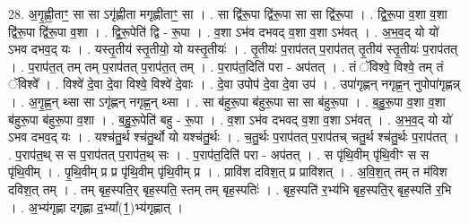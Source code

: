 \documentclass[17pt]{extarticle}
\begin{document}
28. अ॒गृ॒ह्णी॒ताꣳ॒॒ सा सा ऽगृ॑ह्णीता मगृह्णीताꣳ॒॒ सा । . सा द्वि॑रू॒पा द्वि॑रू॒पा सा सा द्वि॑रू॒पा । . द्वि॒रू॒पा व॒शा व॒शा द्वि॑रू॒पा द्वि॑रू॒पा व॒शा । . द्वि॒रू॒पेति॑ द्वि - रू॒पा । . व॒शा ऽभ॑व दभवद् व॒शा व॒शा ऽभ॑वत् । . अ॒भ॒व॒द् यो यो॑ ऽभव दभव॒द् यः । . यस्तृ॒तीय॑ स्तृ॒तीयो॒ यो यस्तृ॒तीयः॑ । . तृ॒तीयः॑ प॒राप॑तत् प॒राप॑तत् तृ॒तीय॑ स्तृ॒तीयः॑ प॒राप॑तत् । . प॒राप॑त॒त् तम् तम् प॒राप॑तत् प॒राप॑त॒त् तम् । . प॒राप॑त॒दिति॑ परा - अप॑तत् । . तं ॅविश्वे॒ विश्वे॒ तम् तं ॅविश्वे᳚ । . विश्वे॑ दे॒वा दे॒वा विश्वे॒ विश्वे॑ दे॒वाः । . दे॒वा उपोप॑ दे॒वा दे॒वा उप॑ । . उपा॑गृह्णन् नगृह्ण॒न् नुपोपा॑गृह्णन्न् । . अ॒गृ॒ह्ण॒न् थ्सा सा ऽगृ॑ह्णन् नगृह्ण॒न् थ्सा । . सा ब॑हुरू॒पा ब॑हुरू॒पा सा सा ब॑हुरू॒पा । . ब॒हु॒रू॒पा व॒शा व॒शा ब॑हुरू॒पा ब॑हुरू॒पा व॒शा । . ब॒हु॒रू॒पेति॑ बहु - रू॒पा । . व॒शा ऽभ॑व दभवद् व॒शा व॒शा ऽभ॑वत् । . अ॒भ॒व॒द् यो यो॑ ऽभव दभव॒द् यः । . यश्च॑तु॒र्थ श्च॑तु॒र्थो यो यश्च॑तु॒र्थः । . च॒तु॒र्थः प॒राप॑तत् प॒राप॑तच् चतु॒र्थ श्च॑तु॒र्थः प॒राप॑तत् । . प॒राप॑त॒थ् स स प॒राप॑तत् प॒राप॑त॒थ् सः । . प॒राप॑त॒दिति॑ परा - अप॑तत् । . स पृ॑थि॒वीम् पृ॑थि॒वीꣳ स स पृ॑थि॒वीम् । . पृ॒थि॒वीम् प्र प्र पृ॑थि॒वीम् पृ॑थि॒वीम् प्र । . प्रावि॑श दविश॒त् प्र प्रावि॑शत् । . अ॒वि॒श॒त् तम् त म॑विश दविश॒त् तम् । . तम् बृह॒स्पति॒र् बृह॒स्पति॒ स्तम् तम् बृह॒स्पतिः॑ । . बृह॒स्पति॑ र॒भ्य॑भि बृह॒स्पति॒र् बृह॒स्पति॑ र॒भि । . अ॒भ्य॑गृह्णा दगृह्णा द॒भ्या᳚(1॒)भ्य॑गृह्णात् । \newline
\end{document}
